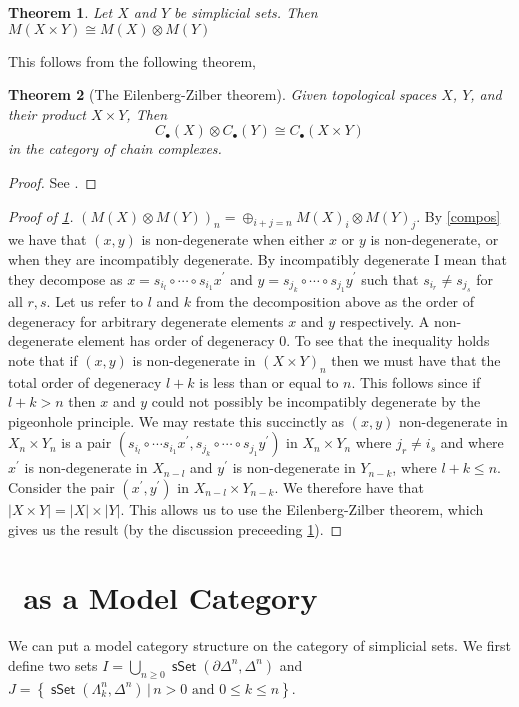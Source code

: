 \documentclass{amsart}
\newcommand{\catname}[1]{{\sffamily\upshape{{#1}}}}
\newcommand{\sset}{\catname{sSet}}
\DeclareMathOperator{\msset}{\mathsf{sSet}}
\newtheorem{theorem}{Theorem}[section]
\theoremstyle{definition}
\begin{document}
\begin{theorem}\label{main}
  Let $X$ and $Y$ be simplicial sets. Then
  $M(X\times Y)\cong M(X)\otimes M(Y)$
\end{theorem}
This follows from the following theorem,
\begin{theorem}[The Eilenberg-Zilber theorem]
  Given topological spaces $X$, $Y$, and their product $X\times Y$,
  Then $$C_\bullet (X)\otimes C_\bullet (Y) \cong C_\bullet(X\times Y)$$
  in the category of chain complexes.
\end{theorem}
\begin{proof}
  See \cite{EZ}.
\end{proof}
\begin{proof}[Proof of \ref{main}]
  $\left(M(X)\otimes M(Y)\right)_n = \oplus_{i+j=n} M(X)_i \otimes M(Y)_j$.
  By \ref{compos} we have that $(x,y)$ is non-degenerate when either $x$ or
  $y$ is non-degenerate, or when they are incompatibly degenerate. By incompatibly
  degenerate I mean that they decompose as
  $x=s_{i_l}\circ\cdots \circ s_{i_1} x^\prime$ and
  $y=s_{j_k}\circ \cdots \circ s_{j_1} y^\prime$ such that $s_{i_r}\neq s_{j_s}$
  for all $r,s$. Let us refer to $l$ and $k$ from the decomposition above
  as the order of degeneracy for
  arbitrary degenerate elements $x$ and $y$ respectively. A non-degenerate element
  has order of degeneracy 0. To see that the inequality
  holds note that if $(x,y)$ is non-degenerate in $(X\times Y)_n$ then we must have
  that the total order of degeneracy $l+k$ is less than or equal to $n$.
  This follows since if $l+k >n$ then $x$ and $y$ could not possibly be
  incompatibly degenerate by the pigeonhole principle. We may restate this
  succinctly as $(x,y)$ non-degenerate in $X_n\times Y_n$ is
  a pair $(s_{i_l}\circ \cdots s_{i_1} x^\prime, s_{j_k}\circ
  \cdots \circ s_{j_1}y^\prime)$ in $X_n\times Y_n$ where $j_r \neq i_s$ and
  where $x^\prime$ is
  non-degenerate in $X_{n-l}$ and $y^\prime$ is non-degenerate in $Y_{n-k}$,
  where $l+k\leq n$.
  Consider the pair $(x^\prime,y^\prime)$ in $X_{n-l}\times Y_{n-k}$.
  We therefore have that $|X\times Y| = |X| \times |Y|$. This allows us to use
  the Eilenberg-Zilber theorem, which gives us the result (by the discussion
  preceeding \ref{main}).
\end{proof}

\section{\sset  \, as a Model Category}
We can put a model category structure on the category of simplicial sets.
We first define two sets $I= \bigcup_{n\geq 0}\msset (\partial \Delta^n, \Delta^n)$
and $J= \left\{ \msset (\Lambda^n_k, \Delta^n)\, \big| \, n>0
  \text{ and }0\leq k\leq n \right\}$.
\end{document}

